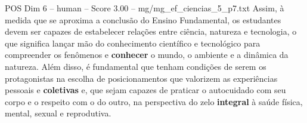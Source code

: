 \begin{textsample}{POS Dim 6 – human – Score 3.00 – mg/mg\_ef\_ciencias\_5\_p7.txt}  \label{ex:f6_pos_014}
Assim, à medida que se aproxima a conclusão do Ensino Fundamental, os estudantes devem ser capazes de estabelecer relações entre ciência, natureza e tecnologia, o que significa lançar mão do conhecimento científico e tecnológico para compreender os fenômenos e \textbf{conhecer} o mundo, o ambiente e a dinâmica da natureza.
Além disso, é fundamental que tenham condições de serem os protagonistas na escolha de posicionamentos que valorizem as experiências pessoais e \textbf{coletivas} e, que sejam capazes de praticar o autocuidado com seu corpo e o respeito com o do outro, na perspectiva do zelo \textbf{integral} à saúde física, mental, sexual e reprodutiva.

\end{textsample}
